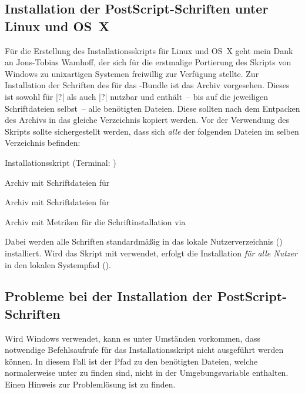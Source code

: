 \subsection{Installation der PostScript-Schriften unter Linux und OS~X}
%
%
Für die Erstellung des Installationsskripts für Linux und OS~X geht mein Dank 
an Jons-Tobias Wamhoff, der sich für die erstmalige Portierung des Skripts 
von Windows zu unixartigen Systemen freiwillig zur Verfügung stellte.
Zur Installation der Schriften des \CDs für das \TUDScript-Bundle ist das Archiv
 vorgesehen. Dieses ist sowohl für |?| als auch 
|?| nutzbar und enthält~-- bis auf die jeweiligen 
Schriftdateien selbst~-- alle benötigten Dateien. Diese sollten nach dem 
Entpacken des Archivs in das gleiche Verzeichnis kopiert werden. Vor der 
Verwendung des Skripts  sollte sichergestellt 
werden, dass sich \emph{alle} der folgenden Dateien im selben Verzeichnis 
befinden:
%
\settowidth{}%
\begin{description}[labelwidth=\tempdim,labelsep=1em]
  \item[\File{tudscrfonts\_install.sh}]Installationsskript
    (Terminal: )
  \item[\File{Univers\_PS.zip}]Archiv mit Schriftdateien für \Univers
  \item[\File{DIN\_Bd\_PS.zip}]Archiv mit Schriftdateien für \DIN
  \item[\File{tudscr\_fonts\_install.zip}]Archiv mit Metriken für die
    Schriftinstallation via 
\end{description}
%
Dabei werden alle Schriften standardmäßig in das lokale Nutzerverzeichnis 
() installiert. Wird das Skript mit  verwendet, 
erfolgt die Installation \emph{für alle Nutzer} in den lokalen Systempfad 
().



\subsection*{Probleme bei der Installation der PostScript-Schriften}
%
Wird Windows verwendet, kann es unter Umständen vorkommen, dass notwendige 
Befehlsaufrufe für das Installationsskript nicht ausgeführt werden können. In 
diesem Fall ist der Pfad zu den benötigten Dateien, welche normalerweise unter 
 zu finden sind, nicht in der 
Umgebungsvariable  enthalten. Einen Hinweis zur Problemlösung ist 
zu finden.

